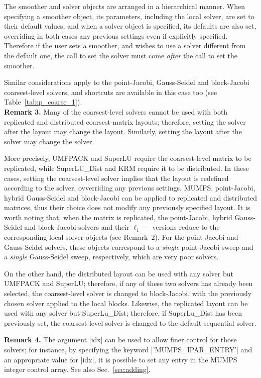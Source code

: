The smoother and solver objects are arranged in a
hierarchical manner. When specifying a smoother object, its parameters,
including the local solver, are set to their default values, and when a solver
object is specified, its defaults are also set, overriding in both
cases any previous settings even if explicitly specified. Therefore if
the user sets a smoother, and wishes to use a solver
different from  the default one, the call to set the solver must come
\emph{after} the call to set the smoother.

Similar considerations apply to the point-Jacobi, Gauss-Seidel and block-Jacobi
coarsest-level solvers, and shortcuts are available
in this case too (see Table~\ref{tab:p_coarse_1}). \\

\textbf{Remark 3.} Many of the coarsest-level solvers cannot be used
with both replicated and distributed coarsest-matrix layouts; 
therefore, setting the solver after the layout may change the layout.
Similarly, setting the layout after the solver may change the solver.

More precisely, UMFPACK and SuperLU require the coarsest-level
matrix to be replicated, while SuperLU\_Dist and KRM require it to be distributed.
In these cases, setting the coarsest-level solver implies that
the layout is redefined according to the solver, ovverriding any
previous settings. MUMPS,  point-Jacobi,
hybrid Gauss-Seidel and block-Jacobi can be applied to
replicated and distributed matrices, thus their choice
does not modify any previously specified layout.
It is worth noting that, when the matrix is replicated,
the point-Jacobi, hybrid Gauss-Seidel and block-Jacobi solvers and their $\ell_1-$ versions
reduce to the corresponding local solver objects (see Remark~2).
For the point-Jacobi and Gauss-Seidel solvers, these objects
correspond to a \emph{single} point-Jacobi sweep and a \emph{single}
Gauss-Seidel sweep, respectively, which are very poor solvers.

On the other hand, the distributed layout can be used with any solver
but UMFPACK and SuperLU; therefore, if any of these two solvers has already
been selected, the coarsest-level solver is changed to block-Jacobi,
with the previously chosen solver applied to the local blocks.
Likewise, the replicated layout can be used with any solver but SuperLu\_Dist;
therefore, if SuperLu\_Dist has been previously set, the coarsest-level
solver is changed to the default sequential solver.

\textbf{Remark 4.}  The argument \fortinline|idx| can be used to allow finer
control for those solvers; for instance, by specifying the keyword
\fortinline|'MUMPS_IPAR_ENTRY'| and an appropriate value for \fortinline|idx|, it is
possible to set any entry in the MUMPS integer control array.
See also Sec.~\ref{sec:adding}.


